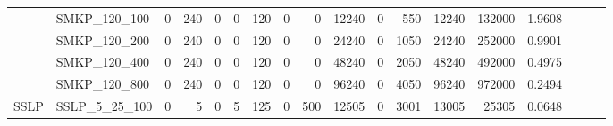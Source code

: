 \begin{landscape}
\begin{longtable}[c]{llrrrrrrrrrrrrrlll}
		& SMKP\_120\_100               & 0                           & 240                        & 0                          & 0                           & 120                        & 0                          & 0                          & 12240                     & 0                         & 550                        & 12240                      & 132000                         & 1.9608                        &                          &                          &                          \\
		& SMKP\_120\_200               & 0                           & 240                        & 0                          & 0                           & 120                        & 0                          & 0                          & 24240                     & 0                         & 1050                       & 24240                      & 252000                         & 0.9901                        &                          &                          &                          \\
		& SMKP\_120\_400               & 0                           & 240                        & 0                          & 0                           & 120                        & 0                          & 0                          & 48240                     & 0                         & 2050                       & 48240                      & 492000                         & 0.4975                        &                          &                          &                          \\
		& SMKP\_120\_800               & 0                           & 240                        & 0                          & 0                           & 120                        & 0                          & 0                          & 96240                     & 0                         & 4050                       & 96240                      & 972000                         & 0.2494                        &                          &                          &                          \\ \hline
		\multirow{24}{*}{SSLP}      & SSLP\_5\_25\_100             & 0                           & 5                          & 0                          & 5                           & 125                        & 0                          & 500                        & 12505                     & 0                         & 3001                       & 13005                      & 25305                          & 0.0648                        &                          &                          &                          \\

\end{longtable}
\end{landscape}
